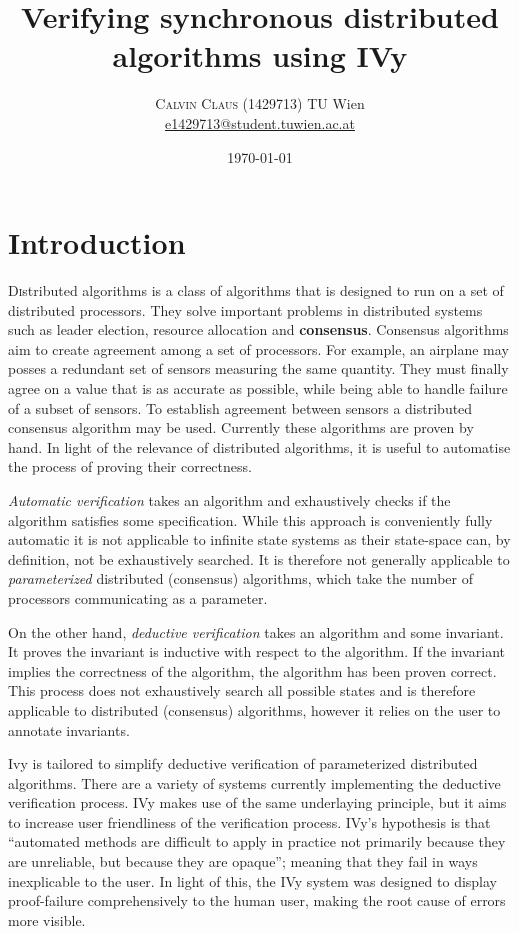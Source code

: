 \documentclass[fleqn]{article}
\title{Verifying synchronous distributed algorithms using IVy} %
\author{%
  \textsc{Calvin Claus (1429713)}
  \normalsize TU Wien\\ %
  \normalsize \href{mailto:e1429713@student.tuwien.ac.at}{e1429713@student.tuwien.ac.at} %
}
\date{\today} %
\begin{document}
\maketitle


\section{Introduction}

\lettrine[nindent=0em,lines=3]{D}istributed algorithms is a class of algorithms that is designed to run on a set of distributed processors. They solve important problems in distributed systems such as leader election, resource allocation and \textbf{consensus}. Consensus algorithms aim to create agreement among a set of processors. For example, an airplane may posses a redundant set of sensors measuring the same quantity. They must finally agree on a value that is as accurate as possible, while being able to handle failure of a subset of sensors. To establish agreement between sensors a distributed consensus algorithm may be used.  Currently these algorithms are proven by hand. In light of the relevance of distributed algorithms, it is useful to automatise the process of proving their correctness.

  \textit{Automatic verification} takes an algorithm and exhaustively checks if the algorithm satisfies some specification. While this approach is conveniently fully automatic it is not applicable to infinite state systems as their state-space can, by definition, not be exhaustively searched. It is therefore not generally applicable to \textit{parameterized} distributed (consensus) algorithms, which take the number of processors communicating as a parameter.\cite{limits}

  On the other hand, \textit{deductive verification} takes an algorithm and some invariant. It proves the invariant is inductive with respect to the algorithm. If the invariant implies the correctness of the algorithm, the algorithm has been proven correct. This process does not exhaustively search all possible states and is therefore applicable to distributed (consensus) algorithms, however it relies on the user to annotate invariants.

  Ivy is tailored to simplify deductive verification of parameterized distributed algorithms. There are a variety of systems currently implementing the deductive verification process. IVy makes use of the same underlaying principle, but it aims to increase user friendliness of the verification process.  IVy's hypothesis is that ``automated methods are difficult to apply in practice not primarily because they are unreliable, but because they are opaque''; meaning that they fail in ways inexplicable to the user. In light of this, the IVy system was designed to display proof-failure comprehensively to the human user, making the root cause of errors more visible. \cite[ p.1]{ivy}
\end{document}
